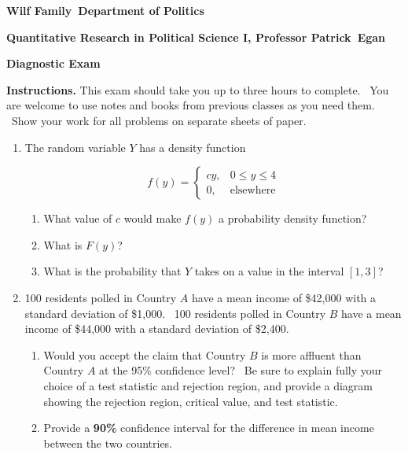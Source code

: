 \documentclass[11pt]{article}
\begin{document}
\begin{center}
\textbf{Wilf Family\ Department of Politics}

\textbf{Quantitative Research in Political Science I, Professor Patrick\ Egan%
}

\textbf{Diagnostic Exam}
\end{center}

\bigskip

\noindent \textbf{Instructions.} This exam should take you up to three hours
to complete. \ You are welcome to use notes and books from previous classes
as you need them. \ Show your work for all problems on separate sheets of
paper. \ \ 

\bigskip

\begin{enumerate}
\item The random variable $Y$ has a density function

\begin{equation*}
f(y)=\left\{ 
\begin{array}{cc}
cy, & 0\leq y\leq 4 \\ 
0, & \text{elsewhere}%
\end{array}%
\right.
\end{equation*}

\begin{enumerate}
\item What value of $c$ would make $f(y)$ a probability density function?

\item What is $F(y)$?

\item What is the probability that $Y$ takes on a value in the interval $%
[1,3]$?
\end{enumerate}

\item 100 residents polled in Country $A$ have a mean income of \$42,000
with a standard deviation of \$1,000. \ 100 residents polled in Country $B$
have a mean income of \$44,000 with a standard deviation of \$2,400. \ \ 

\begin{enumerate}
\item Would you accept the claim that Country $B$ is more affluent than
Country $A$ at the 95\% confidence level? \ Be sure to explain fully your
choice of a test statistic and rejection region, and provide a diagram
showing the rejection region, critical value, and test statistic.

\item Provide a \textbf{90\%} confidence interval for the difference in mean
income between the two countries.
\end{enumerate}


\end{enumerate}
\end{document}
